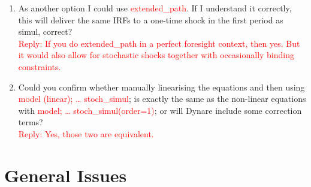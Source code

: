 \documentclass[cn,10pt,math=newtx,citestyle=gb7714-2015,bibstyle=gb7714-2015]{elegantbook}
\begin{document}
{{\begin{enumerate}
{			the use of piece-wise linearity in Occbin for the particular type of problem eases computations. But if you find a solution, then the results should be the same.}
		\item As another option I could use \textcolor{red}{extended\_path}. If I understand it correctly, this will deliver the same IRFs to a one-time shock in the first period as simul, correct?\\
		\textcolor{red}{Reply: If you do extended\_path in a perfect foresight context, then yes. But it would also allow for stochastic shocks together with occasionally binding constraints.}
		\item Could you confirm whether manually linearising the equations and then using \textcolor{red}{model (linear); … stoch\_simul}; is exactly the same as the non-linear equations with \textcolor{red}{model; … stoch\_simul(order=1)}; or will Dynare include some correction terms?\\
		\textcolor{red}{Reply:
			Yes, those two are equivalent.
		}
		
	\end{enumerate}
	
	\section{General Issues}
	
}}
\end{document}
